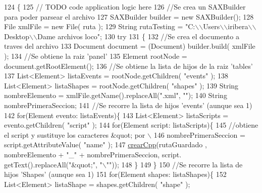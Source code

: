 \begin{DoxyCode}
124                                                               \{
125         \textcolor{comment}{// TODO code application logic here}
126         \textcolor{comment}{//Se crea un SAXBuilder para poder parsear el archivo}
127         SAXBuilder builder = \textcolor{keyword}{new} SAXBuilder();
128         File xmlFile = \textcolor{keyword}{new} File( ruta );
129         String rutaTesting = \textcolor{stringliteral}{"C:\(\backslash\)\(\backslash\)Users\(\backslash\)\(\backslash\)iribera\(\backslash\)\(\backslash\)Desktop\(\backslash\)\(\backslash\)Dame archivos loco"};
130         \textcolor{keywordflow}{try}
131         \{
132             \textcolor{comment}{//Se crea el documento a traves del archivo}
133             Document document = (Document) builder.build( xmlFile );
134             \textcolor{comment}{//Se obtiene la raiz 'panel'}
135             Element rootNode = document.getRootElement();
136             \textcolor{comment}{//Se obtiene la lista de hijos de la raiz 'tables'}
137             List<Element> listaEvents = rootNode.getChildren( \textcolor{stringliteral}{"events"} );
138             List<Element> listaShapes = rootNode.getChildren( \textcolor{stringliteral}{"shapes"} );
139             String nombreElemento = xmlFile.getName().replaceAll(\textcolor{stringliteral}{".xml"}, \textcolor{stringliteral}{""});
140             String nombrePrimeraSeccion;
141             \textcolor{comment}{//Se recorre la lista de hijos 'events' (aunque sea 1)}
142             \textcolor{keywordflow}{for}(Element evento: listaEvents)\{  
143                 List<Element> listaScripts = evento.getChildren( \textcolor{stringliteral}{"script"} );
144                 \textcolor{keywordflow}{for}(Element script: listaScripts)\{
145                     \textcolor{comment}{//obtiene el script y sustituye los caracteres &quot; por \(\backslash\)}
146 \textcolor{comment}{                    nombrePrimeraSeccion = script.getAttributeValue( "name" );}
147                     \mbox{\hyperlink{classactualizadordoxy_1_1_actualizador_doxy_aebb9505e0384909ac6e2e677f400eaec}{crearCpp}}(rutaGuardado , nombreElemento + \textcolor{stringliteral}{"\_"} + nombrePrimeraSeccion, script.
      getText().replaceAll(\textcolor{stringliteral}{"&quot;"}, \textcolor{stringliteral}{"\(\backslash\)""}));
148                 \}
149             \}
150             \textcolor{comment}{//Se recorre la lista de hijos 'Shapes' (aunque sea 1)}
151             \textcolor{keywordflow}{for}(Element shapes: listaShapes)\{  
152                 List<Element> listaShape = shapes.getChildren( \textcolor{stringliteral}{"shape"} );

\end{DoxyCode}
